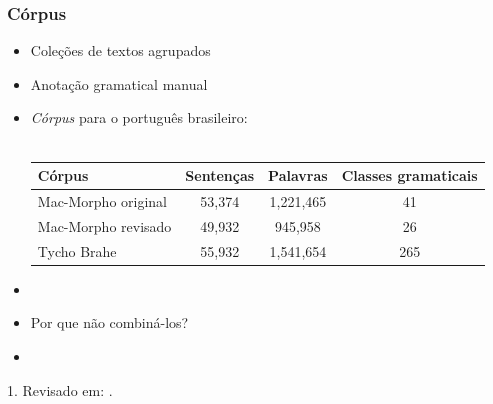 \documentclass[10pt]{beamer}
\begin{document}
\begin{frame}[fragile]
  \frametitle{Córpus}

  \begin{itemize}
    \item[-] Coleções de textos agrupados
    \item[-] Anotação gramatical manual
    \item[-] \textit{Córpus} para o português brasileiro:\\ \

    \begin{table}[!htb]
    \footnotesize
    \centering
    \begin{tabular}{lccc}
      \toprule
      \textbf{Córpus} & \textbf{Sentenças}  & \textbf{Palavras}  & \textbf{Classes gramaticais}  \\
      \midrule
      Mac-Morpho original & 53,374 & 1,221,465 & 41  \\
      Mac-Morpho revisado\footnotemark & 49,932 & 945,958   & 26  \\
      Tycho Brahe         & 55,932 & 1,541,654 & 265 \\
      \bottomrule
    \end{tabular}
    \end{table}

  \item[\ ] \ 
  \item[-] Por que não combiná-los?
  \item[\ ] \ 
  \end{itemize}


{\scriptsize 1. Revisado em: \cite{fonseca2015evaluating}.}

\end{frame}
\end{document}

